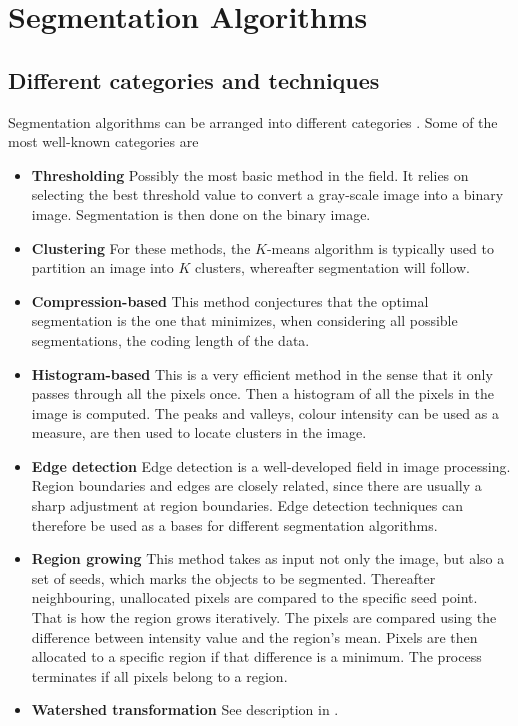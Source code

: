 \documentclass[a4paper,10pt]{article}
\begin{document}
\section{Segmentation Algorithms}
\subsection{Different categories and techniques}
Segmentation algorithms can be arranged into different categories \cite{is}. 
Some of the most well-known categories are
\begin{itemize}
 \item \textbf{Thresholding}  Possibly the most basic method in the
field.  It relies on selecting the best threshold value to convert a gray-scale
image into a binary image.  Segmentation is then done on the binary image. 
 \item \textbf{Clustering} For these methods, the $K$-means algorithm
is typically used to partition an image into $K$ clusters, whereafter
segmentation will follow.
 \item \textbf{Compression-based} This method conjectures that the
optimal segmentation is the one that minimizes, when considering all possible
segmentations, the coding length of the data.
 \item \textbf{Histogram-based}  This is a very efficient method in the
sense that it only passes through all the pixels once.  Then a histogram of all
the pixels in the image is computed.  The peaks and valleys, colour intensity
can be used as a measure, are then used to locate clusters in the image.
 \item \textbf{Edge detection} Edge detection is a well-developed
field in image processing.  Region boundaries and edges are closely related,
since there are usually a sharp adjustment at region boundaries.  Edge detection
techniques can therefore be used as a bases for different segmentation
algorithms.  
 \item \textbf{Region growing} This method takes as input not only
the image, but also a set of seeds, which marks the objects to be segmented. 
Thereafter neighbouring, unallocated pixels are compared to the specific seed
point.  That is how the region grows iteratively.  The pixels are compared using
the difference between intensity value and the region's mean.  Pixels are then
allocated to a specific region if that difference is a minimum.  The process
terminates if all pixels belong to a region.  
 \item \textbf{Watershed transformation} See description in .    

\end{itemize}
\end{document}
